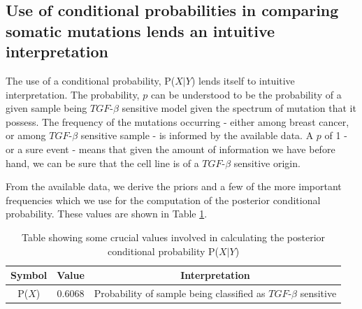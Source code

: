 \documentclass[a4paper,12pt]{article}
\begin{document}
\subsection{Use of conditional probabilities in comparing somatic
  mutations lends an intuitive interpretation}
The use of a conditional probability,
P($\textit{X}$$\mid$$\textit{Y}$) lends itself to intuitive
interpretation. The probability, $\textit{p}$ can be understood to be
the probability of a given sample being  $\textit{TGF}$-$\beta$
sensitive model given the spectrum of mutation that it possess. The
frequency of the mutations occurring - either among breast cancer, or
among $\textit{TGF}$-$\beta$ sensitive sample - is informed by the
available data. A $\textit{p}$ of 1 - or a sure event - means that
given the amount of information we have before hand, we can be sure
that the cell line is of a $\textit{TGF}$-$\beta$ sensitive origin.

From the available data, we derive the priors and a few of the more
important frequencies which we use for the computation of the
posterior conditional probability. These values are shown in Table \ref{probs}.

\begin{table}[b]
\caption{Table showing some crucial values involved in calculating the
posterior conditional probability P($\textit{X}$$\mid$$\textit{Y}$)}
\label{probs}
\begin{tabular}{c c c}
  \hline
  Symbol & Value & Interpretation\\
  \hline
  P($\textit{X}$) & 0.6068 & Probability of sample being classified
  as $\textit{TGF}$-$\beta$ sensitive\\
  \hline
\end{tabular}
\end{table}
\end{document}
